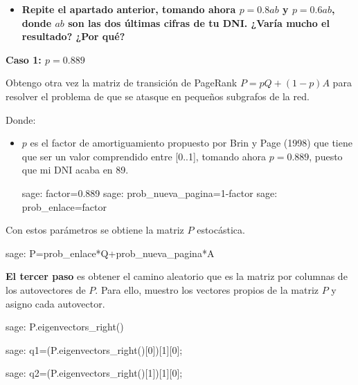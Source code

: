 \begin{ejer}
    \begin{itemize}
        \item \textbf{Repite el apartado anterior, tomando ahora $p = 0.8ab$ y $p = 0.6ab$, donde $ab$ son las dos últimas cifras de tu DNI. ¿Varía mucho el resultado? ¿Por qué?}
    \end{itemize}
\end{ejer}
\par\textbf{Caso 1: $p = 0.889$}
\par Obtengo otra vez la matriz de transición de PageRank $P=pQ + (1-p)A$ para resolver el 
problema de que se atasque en pequeños subgrafos de la red.
\par Donde:
\begin{itemize}
    \item $p$ es el factor de amortiguamiento propuesto por Brin y Page (1998) que tiene que ser un valor 
    comprendido entre [0..1], tomando ahora $p = 0.889$, puesto que mi DNI acaba en 89.
    \begin{sagecommandline}
        sage: factor=0.889
        sage: prob_nueva_pagina=1-factor
        sage: prob_enlace=factor
    \end{sagecommandline}
\end{itemize}

\par Con estos parámetros se obtiene la matriz $P$ estocástica.
\begin{sagecommandline}
    sage: P=prob_enlace*Q+prob_nueva_pagina*A
\end{sagecommandline}

\par \textbf{El tercer paso} es obtener el camino aleatorio que es la matriz por columnas de los autovectores de $P$.
Para ello, muestro los vectores propios de la matriz $P$ y asigno cada autovector.
\begin{sagecommandline}[\textwidth]
    sage: P.eigenvectors_right()
\end{sagecommandline}

  
\begin{sagecommandline}
    sage: q1=(P.eigenvectors_right()[0])[1][0];
\end{sagecommandline}

\begin{sagecommandline}
    sage: q2=(P.eigenvectors_right()[1])[1][0];
\end{sagecommandline}

